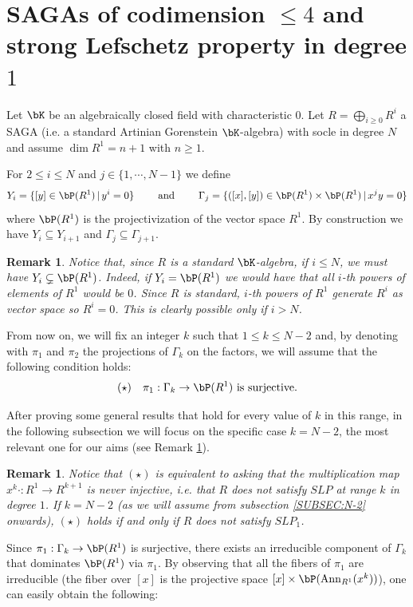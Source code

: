 \documentclass[a4paper,11pt]{amsart}
\newtheorem{remark}[theorem]{Remark}
\DeclareMathOperator{\Ann}{Ann}
\begin{document}
\section{SAGAs of codimension $\leq 4$ and strong Lefschetz property in degree $1$}
\label{SEC:2}

Let $\bK$ be an algebraically closed field with characteristic $0$. 
Let $R=\bigoplus_{i\ge 0}R^i$ a SAGA (i.e. a standard Artinian Gorenstein $\bK$-algebra) with socle in degree $N$ and assume $\dim R^1=n+1$ with $n\geq 1$.

For $2\leq i\leq N$ and $j\in\{1,\cdots,N-1\}$ we define 
$$Y_{i}= \{[y]\in \bP(R^1)\,|\, y^{i}=0\}\qquad \mbox{ and }\qquad 
\Gamma_j=\{([x],[y])\in \bP(R^1) \times \bP(R^1)\,|\, x^{j}y=0\}$$
where $\bP(R^1)$ is the projectivization of the vector space $R^1$.
By construction we have $Y_i\subseteq Y_{i+1}$ and $\Gamma_{j}\subseteq \Gamma_{j+1}$. 

\begin{remark}
\label{REM:HP}
Notice that, since $R$ is a standard $\bK$-algebra, if $i\leq N$, we must have $Y_i\subsetneq\bP(R^1)$. Indeed, if $Y_i=\bP(R^1)$ we would have that all $i$-th powers of elements of $R^1$ would be $0$. Since $R$ is standard, $i$-th powers of $R^1$ generate $R^i$ as vector space so $R^i=0$. This is clearly possible only if $i>N$.
\end{remark}

From now on, we will fix an integer $k$ such that $1\leq k\le N-2$ and, by denoting with $\pi_1$ and $\pi_2$ the projections of $\Gamma_k$ on the factors,
we will assume that the following condition holds:
$$(\star)\quad \pi_1:\Gamma_k\to \bP(R^1) \mbox{ is surjective}.$$

After proving some general results that hold for every value of $k$ in this range, in the following subsection we will focus on the specific case $k=N-2$, the most relevant one for our aims (see Remark \ref{REM:Valk}).

\begin{remark} 
\label{REM:Valk}
Notice that $(\star)$ is equivalent to asking that the multiplication map $x^k\cdot:R^1\to R^{k+1}$ is never injective, i.e. that $R$ does not satisfy $SLP$ at range $k$ in degree $1$. If $k=N-2$ (as we will assume from subsection \ref{SUBSEC:N-2} onwards), $(\star)$ holds if and only if $R$ does not satisfy $SLP_1$.
\end{remark}

Since $\pi_1:\Gamma_k\to \bP(R^1)$ is surjective, there exists an irreducible component of $\Gamma_k$ that dominates $\bP(R^1)$ via $\pi_1$. By observing that all the fibers of $\pi_1$ are irreducible (the fiber over $[x]$ is the projective space $[x]\times\bP(\Ann_{R^1}(x^k))$), one can easily obtain the following: 
\end{document}
